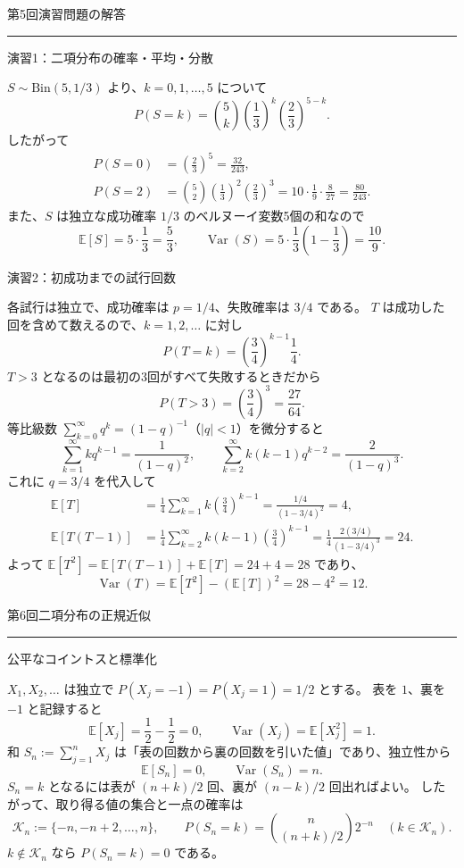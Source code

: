\documentclass[a4paper,10pt,pdflatex,ja=standard,jafont=ipaex-type1,
  magstyle=real,scale=1]{bxjsarticle}
\newcommand{\coursename}{確率論と統計学 I}
\newcommand{\topic}[1]{\par\vspace{5pt}
  {\large\sffamily\mdseries\color{accent}#1}\par\vspace{2pt}}
\newcommand{\handouttitle}[1]{%
  \begin{center}
    {\Large\color{ink}#1}\par\vspace{3mm}
    {\color{accent}\rule{0.88\linewidth}{0.7pt}}
  \end{center}\vspace{-2mm}}
\newcommand{\E}{\mathbb E}
\newcommand{\Var}{\operatorname{Var}}
\begin{document}
\fontsize{10pt}{13.5pt}\selectfont
\begingroup
\fancyhead[L]{\small\color{ink}\coursename{}・前回の演習解答}
\handouttitle{第5回\quad 演習問題の解答}

\topic{演習1：二項分布の確率・平均・分散}
$S\sim\mathrm{Bin}(5,1/3)$ より、$k=0,1,\ldots,5$ について
$$P(S=k)=\binom5k\left(\frac13\right)^k\left(\frac23\right)^{5-k}.$$
したがって
$$\begin{aligned}
 P(S=0)&=\left(\frac23\right)^5=\frac{32}{243},\\
 P(S=2)&=\binom52\left(\frac13\right)^2\left(\frac23\right)^3
       =10\cdot\frac19\cdot\frac8{27}=\frac{80}{243}.
\end{aligned}$$
また、$S$ は独立な成功確率 $1/3$ のベルヌーイ変数5個の和なので
$$\E[S]=5\cdot\frac13=\frac53,\qquad
 \Var(S)=5\cdot\frac13\left(1-\frac13\right)=\frac{10}{9}.$$

\topic{演習2：初成功までの試行回数}
各試行は独立で、成功確率は $p=1/4$、失敗確率は $3/4$ である。
$T$ は成功した回を含めて数えるので、$k=1,2,\ldots$ に対し
$$P(T=k)=\left(\frac34\right)^{k-1}\frac14.$$
$T>3$ となるのは最初の3回がすべて失敗するときだから
$$P(T>3)=\left(\frac34\right)^3=\frac{27}{64}.$$
等比級数 $\sum_{k=0}^\infty q^k=(1-q)^{-1}$（$|q|<1$）を微分すると
$$\sum_{k=1}^\infty kq^{k-1}=\frac1{(1-q)^2},\qquad
 \sum_{k=2}^\infty k(k-1)q^{k-2}=\frac2{(1-q)^3}.$$
これに $q=3/4$ を代入して
$$\begin{aligned}
 \E[T]&=\frac14\sum_{k=1}^\infty k\left(\frac34\right)^{k-1}
       =\frac{1/4}{(1-3/4)^2}=4,\\
 \E[T(T-1)]&=\frac14\sum_{k=2}^\infty k(k-1)\left(\frac34\right)^{k-1}
       =\frac14\frac{2(3/4)}{(1-3/4)^3}=24.
\end{aligned}$$
よって $\E[T^2]=\E[T(T-1)]+\E[T]=24+4=28$ であり、
$$\Var(T)=\E[T^2]-(\E[T])^2=28-4^2=12.$$
\clearpage
\endgroup

\handouttitle{第6回\quad 二項分布の正規近似}

\topic{公平なコイントスと標準化}
$X_1,X_2,\ldots$ は独立で $P(X_j=-1)=P(X_j=1)=1/2$ とする。
表を $1$、裏を $-1$ と記録すると
$$\E[X_j]=\frac12-\frac12=0,\qquad
 \Var(X_j)=\E[X_j^2]=1.$$
和 $S_n:=\sum_{j=1}^nX_j$ は「表の回数から裏の回数を引いた値」であり、独立性から
$$\E[S_n]=0,\qquad \Var(S_n)=n.$$
$S_n=k$ となるには表が $(n+k)/2$ 回、裏が $(n-k)/2$ 回出ればよい。
したがって、取り得る値の集合と一点の確率は
$$\mathcal K_n:=\{-n,-n+2,\ldots,n\},\qquad
 P(S_n=k)=\binom{n}{(n+k)/2}2^{-n}\quad(k\in\mathcal K_n).$$
$k\notin\mathcal K_n$ なら $P(S_n=k)=0$ である。
\end{document}
